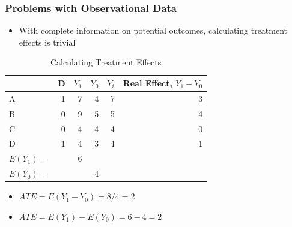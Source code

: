 \documentclass[xcolor=x11names,compress]{beamer}\usepackage[]{graphicx}\usepackage[]{color}
\renewcommand{\(}{\begin{columns}}
\renewcommand{\)}{\end{columns}}
\newcommand{\<}[1]{\begin{column}{#1}}
\renewcommand{\>}{\end{column}}
\begin{document}
\begin{frame}
\frametitle{Problems with Observational Data}
\begin{itemize}
\item With complete information on potential outcomes, calculating treatment effects is trivial
\pause
\end{itemize}
\begin{table}[htbp]
  \centering
  \caption{Calculating Treatment Effects}
    \begin{tabular}{|l|r|r|r|r|r|}
    \hline
          & \multicolumn{1}{l|}{D} & \multicolumn{1}{l|}{$Y_1$} & \multicolumn{1}{l|}{$Y_0$} & \multicolumn{1}{l|}{$Y_i$} & \multicolumn{1}{l|}{Real Effect, $Y_1 - Y_0$} \bigstrut\\
    \hline
    A     & 1     & 7     & 4     & 7     & 3 \bigstrut\\
    \hline
    B     & 0     & 9     & 5     & 5     & 4 \bigstrut\\
    \hline
    C     & 0     & 4     & 4     & 4     & 0 \bigstrut\\
    \hline
    D     & 1     & 4     & 3     & 4     & 1 \bigstrut\\
    \hline \pause
    $E(Y_1)=$ & & 6 & & \bigstrut\\
    \hline
    $E(Y_0)=$ & &  & 4& \bigstrut\\
    \hline
    \end{tabular}%
  \label{tab:addlabel}%
\end{table}%
\begin{itemize}
\item $ATE = E(Y_1-Y_0) = 8/4 = 2$
\item $ATE = E(Y_1) - E(Y_0) = 6 - 4 = 2$
\end{itemize}
\end{frame}
\end{document}
